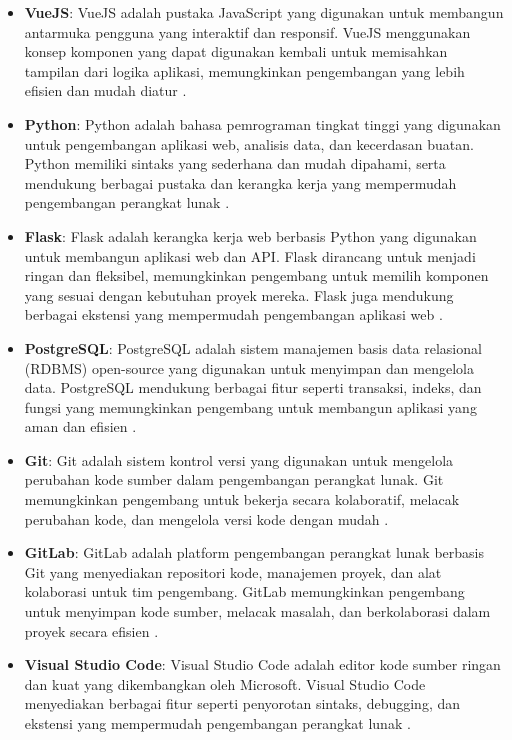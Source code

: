 \begin{itemize}
    \item \textbf{VueJS}: VueJS adalah pustaka JavaScript yang digunakan untuk membangun antarmuka pengguna yang interaktif dan responsif. VueJS menggunakan konsep komponen yang dapat digunakan kembali untuk memisahkan tampilan dari logika aplikasi, memungkinkan pengembangan yang lebih efisien dan mudah diatur \cite{vuedocs}.

    \item \textbf{Python}: Python adalah bahasa pemrograman tingkat tinggi yang digunakan untuk pengembangan aplikasi web, analisis data, dan kecerdasan buatan. Python memiliki sintaks yang sederhana dan mudah dipahami, serta mendukung berbagai pustaka dan kerangka kerja yang mempermudah pengembangan perangkat lunak \cite{python}.

    \item \textbf{Flask}: Flask adalah kerangka kerja web berbasis Python yang digunakan untuk membangun aplikasi web dan API. Flask dirancang untuk menjadi ringan dan fleksibel, memungkinkan pengembang untuk memilih komponen yang sesuai dengan kebutuhan proyek mereka. Flask juga mendukung berbagai ekstensi yang mempermudah pengembangan aplikasi web \cite{flask}.

    \item \textbf{PostgreSQL}: PostgreSQL adalah sistem manajemen basis data relasional (RDBMS) open-source yang digunakan untuk menyimpan dan mengelola data. PostgreSQL mendukung berbagai fitur seperti transaksi, indeks, dan fungsi yang memungkinkan pengembang untuk membangun aplikasi yang aman dan efisien \cite{postgresql}.

    \item \textbf{Git}: Git adalah sistem kontrol versi yang digunakan untuk mengelola perubahan kode sumber dalam pengembangan perangkat lunak. Git memungkinkan pengembang untuk bekerja secara kolaboratif, melacak perubahan kode, dan mengelola versi kode dengan mudah \cite{git}.

    \item \textbf{GitLab}: GitLab adalah platform pengembangan perangkat lunak berbasis Git yang menyediakan repositori kode, manajemen proyek, dan alat kolaborasi untuk tim pengembang. GitLab memungkinkan pengembang untuk menyimpan kode sumber, melacak masalah, dan berkolaborasi dalam proyek secara efisien \cite{gitlab}.

    \item \textbf{Visual Studio Code}: Visual Studio Code adalah editor kode sumber ringan dan kuat yang dikembangkan oleh Microsoft. Visual Studio Code menyediakan berbagai fitur seperti penyorotan sintaks, debugging, dan ekstensi yang mempermudah pengembangan perangkat lunak \cite{vscode}.


\end{itemize}
